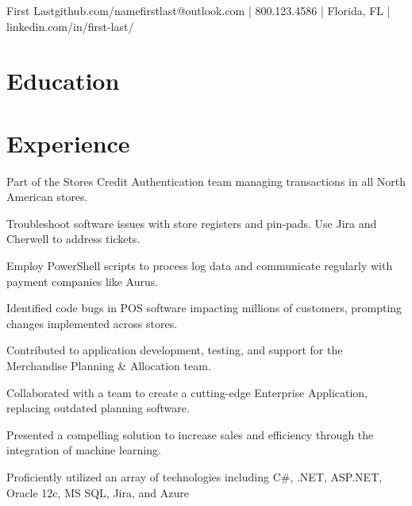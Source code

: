 \documentclass[]{deedy-resume-openfont}
\begin{document}
%
%


\namesection \LARGE {{First} {Last}}{github.com/name}{firstlast@outlook.com | 800.123.4586 | Florida, FL | linkedin.com/in/first-last/}

\hspace{\parindent}

\section{Education}
\sectionsep

\section{Experience}

\vspace{\topsep} 

\begin{tightemize}
\item Part of the Stores Credit Authentication team managing transactions in all North American stores.
\item Troubleshoot software issues with store registers and pin-pads. Use Jira and Cherwell to address tickets. 
\item Employ PowerShell scripts to process log data and communicate regularly with payment companies like Aurus.
\item Identified code bugs in POS software impacting millions of customers, prompting changes implemented across stores.
\end{tightemize}
\sectionsep

\begin{tightemize}
\item Contributed to application development, testing, and support for the Merchandise Planning \& Allocation team.
\item Collaborated with a team to create a cutting-edge Enterprise Application, replacing outdated planning software.  
\item Presented a compelling solution to increase sales and efficiency through the integration of machine learning.
\item Proficiently utilized an array of technologies including C\#, .NET, ASP.NET, Oracle 12c, MS SQL, Jira, and Azure
\end{tightemize}
\sectionsep
\end{document}
